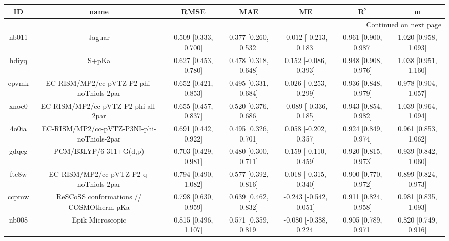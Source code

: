 \documentclass{article}
\begin{document}
\begin{center}
\begin{longtable}{|ccccccc|}
\toprule
    ID &                                               name &                  RMSE &                   MAE &                       ME &                 R$^2$ &                      m \\
\midrule
\endhead
\midrule
\multicolumn{7}{r}{{Continued on next page}} \\
\midrule
\endfoot

\bottomrule
\endlastfoot
 nb011 &                                             Jaguar &  0.509 [0.333, 0.700] &  0.377 [0.260, 0.532] &   -0.012 [-0.213, 0.183] &  0.961 [0.900, 0.987] &   1.020 [0.958, 1.093] \\
 hdiyq &                                              S+pKa &  0.627 [0.453, 0.780] &  0.478 [0.318, 0.648] &    0.152 [-0.086, 0.393] &  0.948 [0.908, 0.976] &   1.038 [0.951, 1.160] \\
 epvmk &           EC-RISM/MP2/cc-pVTZ-P2-phi-noThiols-2par &  0.652 [0.421, 0.853] &  0.495 [0.331, 0.684] &    0.026 [-0.253, 0.299] &  0.936 [0.848, 0.979] &   0.978 [0.904, 1.057] \\
 xnoe0 &                EC-RISM/MP2/cc-pVTZ-P2-phi-all-2par &  0.655 [0.457, 0.837] &  0.520 [0.376, 0.686] &   -0.089 [-0.336, 0.185] &  0.943 [0.854, 0.982] &   1.039 [0.964, 1.094] \\
 4o0ia &         EC-RISM/MP2/cc-pVTZ-P3NI-phi-noThiols-2par &  0.691 [0.442, 0.922] &  0.495 [0.326, 0.701] &    0.058 [-0.202, 0.357] &  0.924 [0.849, 0.974] &   0.961 [0.853, 1.062] \\
 gdqeg &                             PCM/B3LYP/6-311+G(d,p) &  0.703 [0.429, 0.981] &  0.480 [0.300, 0.711] &    0.159 [-0.110, 0.459] &  0.920 [0.815, 0.973] &   0.939 [0.842, 1.060] \\
 ftc8w &             EC-RISM/MP2/cc-pVTZ-P2-q-noThiols-2par &  0.794 [0.490, 1.082] &  0.577 [0.392, 0.816] &    0.018 [-0.315, 0.340] &  0.900 [0.770, 0.972] &   0.899 [0.824, 0.973] \\
 ccpmw &            ReSCoSS conformations // COSMOtherm pKa &  0.798 [0.630, 0.959] &  0.639 [0.462, 0.832] &   -0.243 [-0.542, 0.051] &  0.911 [0.824, 0.958] &   0.981 [0.835, 1.093] \\
 nb008 &                                   Epik Microscopic &  0.815 [0.496, 1.107] &  0.571 [0.359, 0.819] &   -0.080 [-0.388, 0.224] &  0.905 [0.789, 0.971] &   0.820 [0.749, 0.916] \\

\end{longtable}
\end{center}
\end{document}
